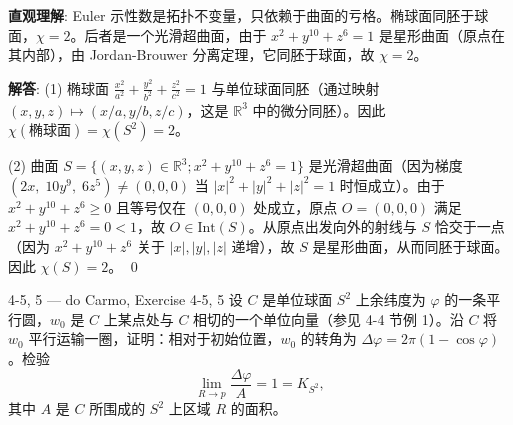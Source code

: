 \begin{solution}
\textbf{直观理解}: Euler 示性数是拓扑不变量，只依赖于曲面的亏格。椭球面同胚于球面，$\chi=2$。后者是一个光滑超曲面，由于 $x^2+y^{10}+z^6=1$ 是星形曲面（原点在其内部），由 Jordan-Brouwer 分离定理，它同胚于球面，故 $\chi=2$。

\textbf{解答}: (1) 椭球面 $\frac{x^2}{a^2}+\frac{y^2}{b^2}+\frac{z^2}{c^2}=1$ 与单位球面同胚（通过映射 $(x,y,z) \mapsto (x/a,y/b,z/c)$，这是 $\mathbb{R}^3$ 中的微分同胚）。因此 $\chi(\text{椭球面}) = \chi(S^2) = 2$。

(2) 曲面 $S = \{(x,y,z)\in\mathbb{R}^3; x^2 + y^{10} + z^6 = 1\}$ 是光滑超曲面（因为梯度 $(2x,\;10y^9,\;6z^5) \neq (0,0,0)$ 当 $|x|^2+|y|^2+|z|^2=1$ 时恒成立）。由于 $x^2+y^{10}+z^6 \geq 0$ 且等号仅在 $(0,0,0)$ 处成立，原点 $O=(0,0,0)$ 满足 $x^2+y^{10}+z^6 = 0 < 1$，故 $O \in \mathrm{Int}(S)$。从原点出发向外的射线与 $S$ 恰交于一点（因为 $x^2+y^{10}+z^6$ 关于 $|x|,|y|,|z|$ 递增），故 $S$ 是星形曲面，从而同胚于球面。因此 $\chi(S) = 2$。
\qed
\end{solution}

\begin{exercise}{4-5, 5 — do Carmo, Exercise 4-5, 5}
设 $C$ 是单位球面 $S^2$ 上余纬度为 $\varphi$ 的一条平行圆，$w_0$ 是 $C$ 上某点处与 $C$ 相切的一个单位向量（参见 4-4 节例 1）。沿 $C$ 将 $w_0$ 平行运输一圈，证明：相对于初始位置，$w_0$ 的转角为 $\Delta\varphi = 2\pi(1 - \cos\varphi)$。检验
\[
\lim_{R \to p} \frac{\Delta\varphi}{A} = 1 = K_{S^2},
\]
其中 $A$ 是 $C$ 所围成的 $S^2$ 上区域 $R$ 的面积。
\end{exercise}

